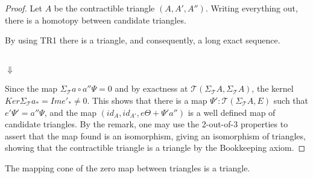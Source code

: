     \begin{proof}
        Let $A$ be the contractible triangle $(A,A',A'')$. Writing everything out, there is a homotopy between candidate triangles.
        \begin{center}
        \end{center}
        By using TR1 there is a triangle, and consequently, a long exact sequence.
        \begin{center}
             \\
            $\Downarrow$ \\
        \end{center}
        Since the map $\Sigma_{\mathcal{T}}a\circ a''\Psi = 0$ and by exactness at $\mathcal{T}(\Sigma_{\mathcal{T}}A,\Sigma_{\mathcal{T}}A)$, the kernel $Ker\Sigma_{\mathcal{T}}a_*=Ime'_*\neq 0$. This shows that there is a map ${\Psi}':\mathcal{T}(\Sigma_{\mathcal{T}}A,E)$ such that $e'{\Psi}'=a''\Psi$, and the map $(id_A,id_{A'},e\Theta+{\Psi}'a'')$ is a well defined map of candidate triangles. By the remark, one may use the 2-out-of-3 properties to assert that the map found is an isomorphism, giving an isomorphism of triangles, showing that the contractible triangle is a triangle by the Bookkeeping axiom. 
    \end{proof}

    \begin{corollary}
        The mapping cone of the zero map between  triangles is a triangle. 
    \end{corollary}

